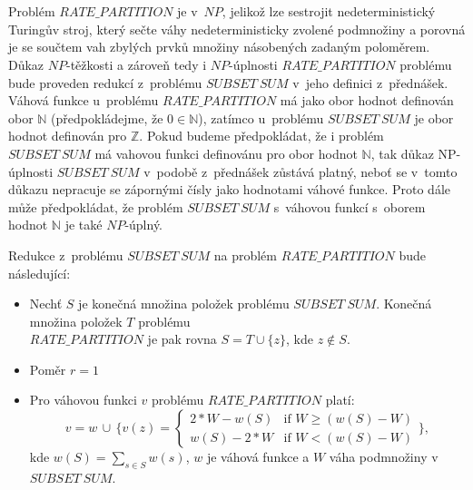 \documentclass[a4paper]{article}
\newcommand{\rp}{RATE\_PARTITION}
\newcommand{\sbs}{SUBSET\ SUM}
\begin{document}
\section*{}
Problém $\rp$ je v~$NP$, jelikož lze sestrojit nedeterministický Turingův stroj, který sečte
váhy nedeterministicky zvolené podmnožiny a porovná je se součtem vah zbylých prvků množiny násobených zadaným poloměrem.
Důkaz $NP$-těžkosti a zároveň tedy i $NP$-úplnosti $\rp$ problému bude proveden redukcí z~problému $\sbs$ v~jeho definici z~přednášek.
Váhová funkce u~problému $\rp$ má jako obor hodnot definován obor $\mathbb{N}$ (předpokládejme, že $0 \in \mathbb{N}$), zatímco u~problému
$\sbs$ je obor hodnot definován pro $\mathbb{Z}$.
Pokud budeme předpokládat, že i problém $\sbs$ má vahovou funkci definovánu pro obor hodnot $\mathbb{N}$, tak důkaz NP-úplnosti
$\sbs$ v~podobě z~přednášek zůstává platný, neboť se v~tomto důkazu nepracuje se zápornými čísly jako hodnotami váhové funkce.
Proto dále může předpokládat, že problém $\sbs$ s~váhovou funkcí s~oborem hodnot $\mathbb{N}$ je také $NP$-úplný.

Redukce z~problému $\sbs$ na problém $\rp$ bude následující:
\begin{itemize}
\item Nechť $S$ je konečná množina položek problému $\sbs$.
Konečná množina položek $T$ problému\\ $\rp$ je pak rovna $S=T \cup \{z\}$,
kde $z \not \in S$.
\item Poměr $r=1$
\item Pro váhovou funkci $v$ problému $\rp$ platí:\\
        $$v=w\, \cup\, \{
    v(z) = 
        \begin{cases}
            2*W-w(S) &\mbox{if } W \geq (w(S)-W) \\
            w(S)-2*W & \mbox{if } W < (w(S)-W) 
        \end{cases}
\},$$
kde $w(S) = \sum_{s\in S} w(s)$, $w$ je váhová funkce a $W$ váha podmnožiny v~$\sbs$.
\end{itemize}
\end{document}

